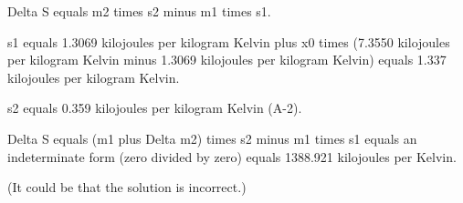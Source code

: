 Delta S equals m2 times s2 minus m1 times s1.

s1 equals 1.3069 kilojoules per kilogram Kelvin plus x0 times (7.3550 kilojoules per kilogram Kelvin minus 1.3069 kilojoules per kilogram Kelvin) equals 1.337 kilojoules per kilogram Kelvin.

s2 equals 0.359 kilojoules per kilogram Kelvin (A-2).

Delta S equals (m1 plus Delta m2) times s2 minus m1 times s1 equals an indeterminate form (zero divided by zero) equals 1388.921 kilojoules per Kelvin.

(It could be that the solution is incorrect.)